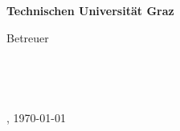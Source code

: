 \begin{titlepage}
\begin{center}
{			{\bfseries\large Technischen Universität Graz} \\[2.0cm] \par
		
			Betreuer \\[0.2cm] \par
		
		}{}
		\Supervisors \\[0.5cm] \par
	
		{\bfseries\large \Institute} \\[2.0cm] \par
	
		\OrganizationsAdditional
		
		\vfill{\flushright \DocumentPlace, \monthyeardate\today}\\
		
	\end{center}
\end{titlepage}
